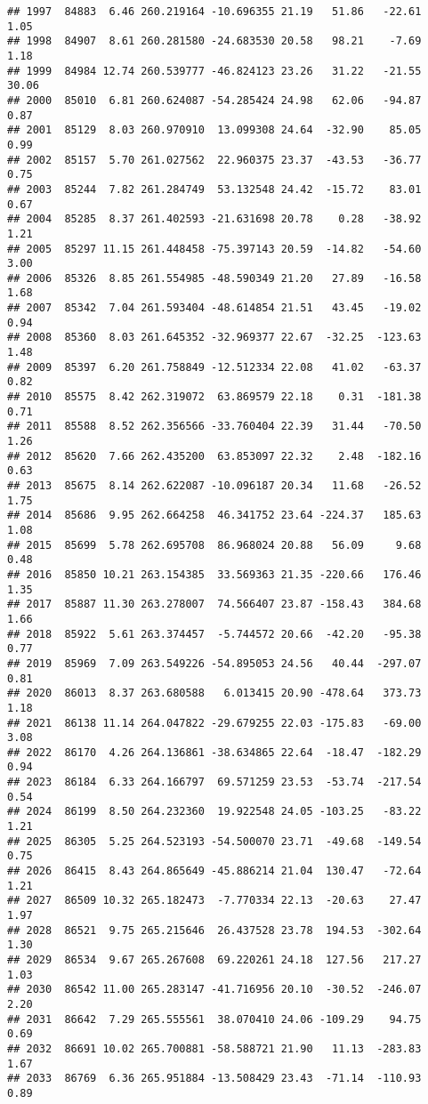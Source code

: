 \documentclass[]{article}
\begin{document}
\begin{verbatim}
## 1997  84883  6.46 260.219164 -10.696355 21.19   51.86   -22.61  1.05
## 1998  84907  8.61 260.281580 -24.683530 20.58   98.21    -7.69  1.18
## 1999  84984 12.74 260.539777 -46.824123 23.26   31.22   -21.55 30.06
## 2000  85010  6.81 260.624087 -54.285424 24.98   62.06   -94.87  0.87
## 2001  85129  8.03 260.970910  13.099308 24.64  -32.90    85.05  0.99
## 2002  85157  5.70 261.027562  22.960375 23.37  -43.53   -36.77  0.75
## 2003  85244  7.82 261.284749  53.132548 24.42  -15.72    83.01  0.67
## 2004  85285  8.37 261.402593 -21.631698 20.78    0.28   -38.92  1.21
## 2005  85297 11.15 261.448458 -75.397143 20.59  -14.82   -54.60  3.00
## 2006  85326  8.85 261.554985 -48.590349 21.20   27.89   -16.58  1.68
## 2007  85342  7.04 261.593404 -48.614854 21.51   43.45   -19.02  0.94
## 2008  85360  8.03 261.645352 -32.969377 22.67  -32.25  -123.63  1.48
## 2009  85397  6.20 261.758849 -12.512334 22.08   41.02   -63.37  0.82
## 2010  85575  8.42 262.319072  63.869579 22.18    0.31  -181.38  0.71
## 2011  85588  8.52 262.356566 -33.760404 22.39   31.44   -70.50  1.26
## 2012  85620  7.66 262.435200  63.853097 22.32    2.48  -182.16  0.63
## 2013  85675  8.14 262.622087 -10.096187 20.34   11.68   -26.52  1.75
## 2014  85686  9.95 262.664258  46.341752 23.64 -224.37   185.63  1.08
## 2015  85699  5.78 262.695708  86.968024 20.88   56.09     9.68  0.48
## 2016  85850 10.21 263.154385  33.569363 21.35 -220.66   176.46  1.35
## 2017  85887 11.30 263.278007  74.566407 23.87 -158.43   384.68  1.66
## 2018  85922  5.61 263.374457  -5.744572 20.66  -42.20   -95.38  0.77
## 2019  85969  7.09 263.549226 -54.895053 24.56   40.44  -297.07  0.81
## 2020  86013  8.37 263.680588   6.013415 20.90 -478.64   373.73  1.18
## 2021  86138 11.14 264.047822 -29.679255 22.03 -175.83   -69.00  3.08
## 2022  86170  4.26 264.136861 -38.634865 22.64  -18.47  -182.29  0.94
## 2023  86184  6.33 264.166797  69.571259 23.53  -53.74  -217.54  0.54
## 2024  86199  8.50 264.232360  19.922548 24.05 -103.25   -83.22  1.21
## 2025  86305  5.25 264.523193 -54.500070 23.71  -49.68  -149.54  0.75
## 2026  86415  8.43 264.865649 -45.886214 21.04  130.47   -72.64  1.21
## 2027  86509 10.32 265.182473  -7.770334 22.13  -20.63    27.47  1.97
## 2028  86521  9.75 265.215646  26.437528 23.78  194.53  -302.64  1.30
## 2029  86534  9.67 265.267608  69.220261 24.18  127.56   217.27  1.03
## 2030  86542 11.00 265.283147 -41.716956 20.10  -30.52  -246.07  2.20
## 2031  86642  7.29 265.555561  38.070410 24.06 -109.29    94.75  0.69
## 2032  86691 10.02 265.700881 -58.588721 21.90   11.13  -283.83  1.67
## 2033  86769  6.36 265.951884 -13.508429 23.43  -71.14  -110.93  0.89

\end{verbatim}
\end{document}
